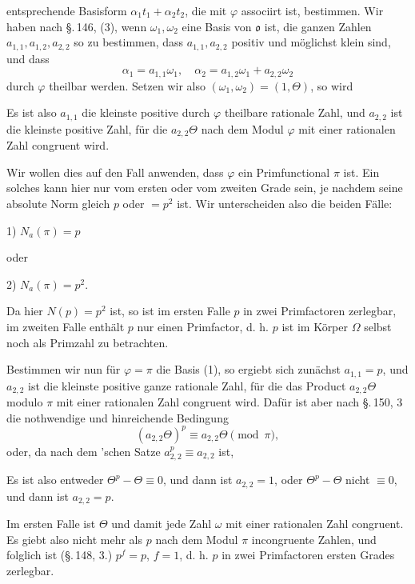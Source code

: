 entsprechende Basisform $\alpha_1 t_1 + \alpha_2 t_2$, die mit $\varphi$ associirt ist, bestimmen. Wir haben nach \S.\,146, (3), wenn $\omega_1, \omega_2$ eine Basis von $\mathfrak{o}$ ist, die ganzen Zahlen $a_{1,1}, a_{1,2}, a_{2,2}$ so zu bestimmen, dass $a_{1,1}, a_{2,2}$ positiv und m\"oglichst klein sind, und dass
\[ \alpha_1 = a_{1,1}\omega_1, \quad \alpha_2 = a_{1,2}\omega_1 + a_{2,2}\omega_2 \]
durch $\varphi$ theilbar werden. Setzen wir also $(\omega_1, \omega_2) = (1, \Theta)$, so wird


Es ist also $a_{1,1}$ die kleinste positive durch $\varphi$ theilbare rationale Zahl, und $a_{2,2}$ ist die kleinste positive Zahl, f\"ur die $a_{2,2}\Theta$ nach dem Modul $\varphi$ mit einer rationalen Zahl congruent wird.

Wir wollen dies auf den Fall anwenden, dass $\varphi$ ein Primfunctional $\pi$ ist. Ein solches kann hier nur vom ersten oder vom zweiten Grade sein, je nachdem seine absolute Norm gleich $p$ oder $=p^2$ ist. Wir unterscheiden also die beiden F\"alle:

1) \quad $N_a(\pi) = p$

oder

2) \quad $N_a(\pi) = p^2.$

Da hier $N(p) = p^2$ ist, so ist im ersten Falle $p$ in zwei Primfactoren zerlegbar, im zweiten Falle enth\"alt $p$ nur einen Primfactor, d. h. $p$ ist im K\"orper $\Omega$ selbst noch als Primzahl zu betrachten.

Bestimmen wir nun f\"ur $\varphi = \pi$ die Basis (1), so ergiebt sich zun\"achst $a_{1,1} = p$, und $a_{2,2}$ ist die kleinste positive ganze rationale Zahl, f\"ur die das Product $a_{2,2}\Theta$ modulo $\pi$ mit einer rationalen Zahl congruent wird. Daf\"ur ist aber nach \S.\,150, 3 die nothwendige und hinreichende Bedingung
\[ (a_{2,2}\Theta)^p \equiv a_{2,2}\Theta \pmod{\pi}, \]
oder, da nach dem 'schen Satze $a_{2,2}^p \equiv a_{2,2}$ ist,


Es ist also entweder $\Theta^p - \Theta \equiv 0$, und dann ist $a_{2,2} = 1$, oder $\Theta^p - \Theta$ nicht $\equiv 0$, und dann ist $a_{2,2} = p$.

Im ersten Falle ist $\Theta$ und damit jede Zahl $\omega$ mit einer rationalen Zahl congruent. Es giebt also nicht mehr als $p$ nach dem Modul $\pi$ incongruente Zahlen, und folglich ist (\S.\,148, 3.) $p^f = p$, $f = 1$, d. h. $p$ in zwei Primfactoren ersten Grades zerlegbar.
